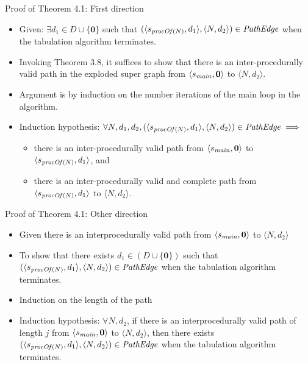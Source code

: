 \begin{frame}{Proof of Theorem 4.1: First direction}
    \begin{itemize}
    \item Given: $\exists d_1 \in D \cup \{\mathbf{0}\}$ such that $(\langle s_{\text{\textit{procOf}}(N)}, d_1 \rangle, \langle N, d_2 \rangle) \in \text{\textit{PathEdge}}$ when the tabulation algorithm terminates.
    
    \item Invoking Theorem 3.8, it suffices to show that there is an inter-procedurally valid path in the exploded super graph from $\langle s_{\text{\textit{main}}}, \mathbf{0} \rangle$ to $\langle N, d_2 \rangle$.
    
    \item Argument is by induction on the number iterations of the main loop in the algorithm.
    
    \item Induction hypothesis:
    $\forall N, d_1, d_2, (\langle s_{\text{\textit{procOf}}(N)}, d_1 \rangle, \langle N, d_2 \rangle) \in \text{\textit{PathEdge}} \implies$
    \begin{itemize}
        \item there is an inter-procedurally valid path from $\langle s_{\text{\textit{main}}}, \mathbf{0} \rangle$ to $\langle s_{\text{\textit{procOf}}(N)}, d_1 \rangle$, and
        \item there is an inter-procedurally valid and complete path from $\langle s_{\text{\textit{procOf}}(N)}, d_1 \rangle$ to $\langle N, d_2 \rangle$.
    \end{itemize}
\end{itemize}
\end{frame}

\begin{frame}{Proof of Theorem 4.1: Other direction}
    \begin{itemize}
    \item Given there is an interprocedurally valid path from $\langle s_{\text{\textit{main}}}, \mathbf{0} \rangle$ to $\langle N, d_2 \rangle$
    
    \item To show that there exists $d_1 \in (D \cup \{\mathbf{0}\})$ such that $(\langle s_{\text{\textit{procOf}}(N)}, d_1 \rangle, \langle N, d_2 \rangle) \in \text{\textit{PathEdge}}$ when the tabulation algorithm terminates.
    \item Induction on the length of the path
    \item Induction hypothesis: $\forall N, d_2$, if there is an interprocedurally valid path of length $j$ from $\langle s_{\text{\textit{main}}}, \mathbf{0} \rangle$ to $\langle N, d_2 \rangle$, then there exists $(\langle s_{\text{\textit{procOf}}(N)}, d_1 \rangle, \langle N, d_2 \rangle) \in \text{\textit{PathEdge}}$ when the tabulation algorithm terminates.
\end{itemize}
\end{frame}


